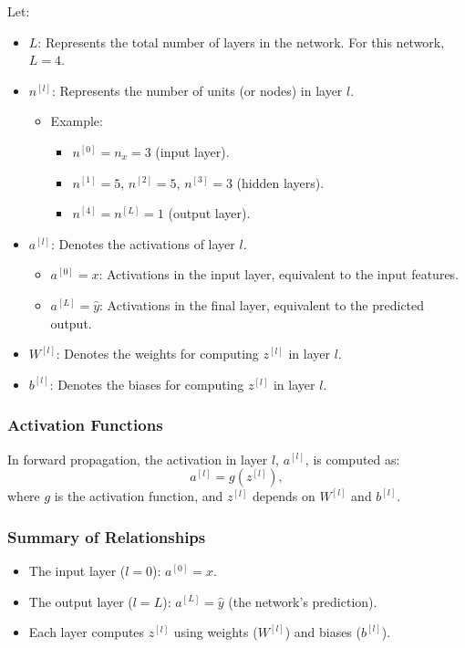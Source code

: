 \documentclass[letterpaper,12pt,notitlepage,twoside]{report}
\begin{document}
Let: \\
\begin{itemize}
    \item \( L \): Represents the total number of layers in the network. For this network, \( L = 4 \).
    \item \( n^{[l]} \): Represents the number of units (or nodes) in layer \( l \).
    \begin{itemize}
        \item Example:
        \begin{itemize}
            \item \( n^{[0]} = n_x = 3 \) (input layer).
            \item \( n^{[1]} = 5 \), \( n^{[2]} = 5 \), \( n^{[3]} = 3 \) (hidden layers).
            \item \( n^{[4]} = n^{[L]} = 1 \) (output layer).
        \end{itemize}
    \end{itemize}
    \item \( a^{[l]} \): Denotes the activations of layer \( l \).
    \begin{itemize}
        \item \( a^{[0]} = x \): Activations in the input layer, equivalent to the input features.
        \item \( a^{[L]} = \hat{y} \): Activations in the final layer, equivalent to the predicted output.
    \end{itemize}
    \item \( W^{[l]} \): Denotes the weights for computing \( z^{[l]} \) in layer \( l \).
    \item \( b^{[l]} \): Denotes the biases for computing \( z^{[l]} \) in layer \( l \).
\end{itemize}

\subsubsection*{Activation Functions}
In forward propagation, the activation in layer \( l \), \( a^{[l]} \), is computed as:
\[
a^{[l]} = g(z^{[l]}),
\]
where \( g \) is the activation function, and \( z^{[l]} \) depends on \( W^{[l]} \) and \( b^{[l]} \).

\subsubsection*{Summary of Relationships}
\begin{itemize}
    \item The input layer (\( l = 0 \)): \( a^{[0]} = x \).
    \item The output layer (\( l = L \)): \( a^{[L]} = \hat{y} \) (the network's prediction).
    \item Each layer computes \( z^{[l]} \) using weights (\( W^{[l]} \)) and biases (\( b^{[l]} \)).
\end{itemize}
\end{document}
